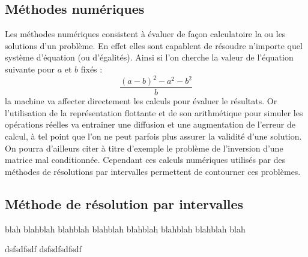 \subsection{Méthodes numériques}
Les méthodes numériques consistent à évaluer de façon calculatoire la ou les solutions d'un problème. En effet elles sont capablent de résoudre n'importe quel système d'équation (ou d'égalités). Ainsi si l'on cherche la valeur de l'équation suivante pour $a$ et $b$ fixés : 
\begin{equation}\label{eq} \frac{{(a-b)}^{2}-a^2-b^2}{b}\end{equation}                                             
la machine va affecter directement les calculs pour évaluer le résultats. Or l'utilisation de la représentation flottante et de son arithmétique pour simuler les opérations réelles va entrainer une diffusion et une augmentation de l'erreur de calcul, à tel point que l'on ne peut  parfois plus assurer la validité d'une solution. On pourra d'ailleurs citer à titre d'exemple le problème de l'inversion d'une matrice mal conditionnée. Cependant ces calculs numériques utilisés  par des méthodes de résolutions par intervalles permettent de contourner ces problèmes.




\subsection{Méthode de résolution par intervalles} 
blah blahblah blahblah \cite{Jermann} blahblah blahblah blahblah\cite{Goldsztejn} blahblah blah  \cite{Goualard}


dsfsdfsdf\cite{Schichl} dsfsdfsdfsdf \cite{Neumaier}
